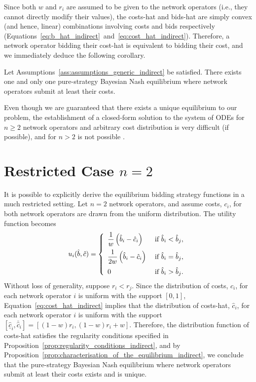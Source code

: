 Since both $w$ and $r_i$ are assumed to be given to the network operators (i.e., they cannot directly modify their values), the costs-hat and bids-hat are simply convex (and hence, linear) combinations involving costs and bids respectively (Equations~\eqref{eq:b_hat_indirect}~and~\eqref{eq:cost_hat_indirect}). Therefore, a network operator bidding their cost-hat is equivalent to bidding their cost, and we immediately deduce the following corollary.
\begin{corollary}
\label{cor:characterization_of_the_equilibrium}
Let Assumptions~\ref{ass:assumptions_generic_indirect} be satisfied. There exists one and only one pure-strategy Bayesian Nash equilibrium where network operators submit at least their costs.
\end{corollary}

Even though we are guaranteed that there exists a unique equilibrium to our problem, the establishment of a closed-form solution to the system of ODEs for $n\ge 2$ network operators and arbitrary cost distribution is very difficult (if possible), and for $n>2$ is not possible \cite{Lebrun2006, Krishna10}.

\section{Restricted Case $n=2$} %
\label{sec:restricted_case_n_2_indirect}
It is possible to explicitly derive the equilibrium bidding strategy functions in a much restricted setting. Let $n=2$ network operators, and assume costs, $c_i$, for both network operators are drawn from the uniform distribution. The utility function becomes
\begin{equation*}
  u_i(\hat{b},\hat{c}) = \left\{
  \begin{array}{l l}
    \displaystyle\frac{1}{w}\left(\hat{b}_i-\hat{c}_i\right) & \;\text{if } \hat{b}_i < \hat{b}_j,\\[2ex]
    \displaystyle\frac{1}{2w}\left(\hat{b}_i-\hat{c}_i\right) & \;\text{if } \hat{b}_i = \hat{b}_j,\\[2ex]
    0 & \;\text{if } \hat{b}_i > \hat{b}_j.
  \end{array}\right.
\end{equation*}
Without loss of generality, suppose $r_i < r_j$. Since the distribution of costs, $c_i$, for each network operator $i$ is uniform with the support $[0,1]$, Equation~\eqref{eq:cost_hat_indirect} implies that the distribution of costs-hat, $\hat{c}_i$, for each network operator $i$ is uniform with the support~${[\underline{\hat{c}}_i, \bar{\hat{c}}_i]} = {[(1-w)r_i, (1-w)r_i + w]}$. Therefore, the distribution function of costs-hat satisfies the regularity conditions specified in Proposition~\ref{prop:regularity_conditions_indirect}, and by Proposition~\ref{prop:characterisation_of_the_equilibrium_indirect}, we conclude that the pure-strategy Bayesian Nash equilibrium where network operators submit at least their costs exists and is unique.

